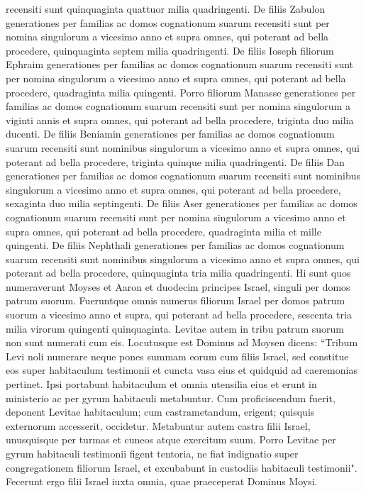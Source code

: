 \begin{biblechapter}
\verse recensiti sunt quinquaginta quattuor milia quadringenti. 
\verse De filiis Zabulon generationes per familias ac domos cognationum suarum recensiti sunt per nomina singulorum a vicesimo anno et supra omnes, qui poterant ad bella procedere, 
\verse quinquaginta septem milia quadringenti. 
\verse De filiis Ioseph filiorum Ephraim generationes per familias ac domos cognationum suarum recensiti sunt per nomina singulorum a vicesimo anno et supra omnes, qui poterant ad bella procedere, 
\verse quadraginta milia quingenti. 
\verse Porro filiorum Manasse generationes per familias ac domos cognationum suarum recensiti sunt per nomina singulorum a viginti annis et supra omnes, qui poterant ad bella procedere, 
\verse triginta duo milia ducenti. 
\verse De filiis Beniamin generationes per familias ac domos cognationum suarum recensiti sunt nominibus singulorum a vicesimo anno et supra omnes, qui poterant ad bella procedere, 
\verse triginta quinque milia quadringenti. 
\verse De filiis Dan generationes per familias ac domos cognationum suarum recensiti sunt nominibus singulorum a vicesimo anno et supra omnes, qui poterant ad bella procedere, 
\verse sexaginta duo milia septingenti. 
\verse De filiis Aser generationes per familias ac domos cognationum suarum recensiti sunt per nomina singulorum a vicesimo anno et supra omnes, qui poterant ad bella procedere, 
\verse quadraginta milia et mille quingenti. 
\verse De filiis Nephthali generationes per familias ac domos cognationum suarum recensiti sunt nominibus singulorum a vicesimo anno et supra omnes, qui poterant ad bella procedere, 
\verse quinquaginta tria milia quadringenti. 
\verse Hi sunt quos numeraverunt Moyses et Aaron et duodecim principes Israel, singuli per domos patrum suorum. 
\verse Fueruntque omnis numerus filiorum Israel per domos patrum suorum a vicesimo anno et supra, qui poterant ad bella procedere, 
\verse sescenta tria milia virorum quingenti quinquaginta. 
\verse Levitae autem in tribu patrum suorum non sunt numerati cum eis. 
\verse Locutusque est Dominus ad Moysen dicens: 
\verse “Tribum Levi noli numerare neque pones summam eorum cum filiis Israel, 
\verse sed constitue eos super habitaculum testimonii et cuncta vasa eius et quidquid ad caeremonias pertinet. Ipsi portabunt habitaculum et omnia utensilia eius et erunt in ministerio ac per gyrum habitaculi metabuntur. 
\verse Cum proficiscendum fuerit, deponent Levitae habitaculum; cum castrametandum, erigent; quisquis externorum accesserit, occidetur. 
\verse Metabuntur autem castra filii Israel, unusquisque per turmas et cuneos atque exercitum suum. 
\verse Porro Levitae per gyrum habitaculi testimonii figent tentoria, ne fiat indignatio super congregationem filiorum Israel, et excubabunt in custodiis habitaculi testimonii". 
\verse Fecerunt ergo filii Israel iuxta omnia, quae praeceperat Dominus Moysi. 
\end{biblechapter}

